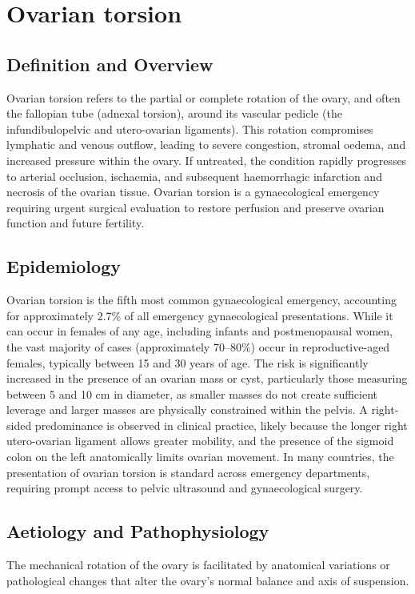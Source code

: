 \chapter{Ovarian torsion}

\section*{Definition and Overview}
Ovarian torsion refers to the partial or complete rotation of the ovary, and often the fallopian tube (adnexal torsion), around its vascular pedicle (the infundibulopelvic and utero-ovarian ligaments). This rotation compromises lymphatic and venous outflow, leading to severe congestion, stromal oedema, and increased pressure within the ovary. If untreated, the condition rapidly progresses to arterial occlusion, ischaemia, and subsequent haemorrhagic infarction and necrosis of the ovarian tissue. Ovarian torsion is a gynaecological emergency requiring urgent surgical evaluation to restore perfusion and preserve ovarian function and future fertility.

\section*{Epidemiology}
Ovarian torsion is the fifth most common gynaecological emergency, accounting for approximately 2.7\% of all emergency gynaecological presentations. While it can occur in females of any age, including infants and postmenopausal women, the vast majority of cases (approximately 70--80\%) occur in reproductive-aged females, typically between 15 and 30 years of age. The risk is significantly increased in the presence of an ovarian mass or cyst, particularly those measuring between 5 and 10 cm in diameter, as smaller masses do not create sufficient leverage and larger masses are physically constrained within the pelvis. A right-sided predominance is observed in clinical practice, likely because the longer right utero-ovarian ligament allows greater mobility, and the presence of the sigmoid colon on the left anatomically limits ovarian movement. In many countries, the presentation of ovarian torsion is standard across emergency departments, requiring prompt access to pelvic ultrasound and gynaecological surgery.

\section*{Aetiology and Pathophysiology}
The mechanical rotation of the ovary is facilitated by anatomical variations or pathological changes that alter the ovary's normal balance and axis of suspension.

